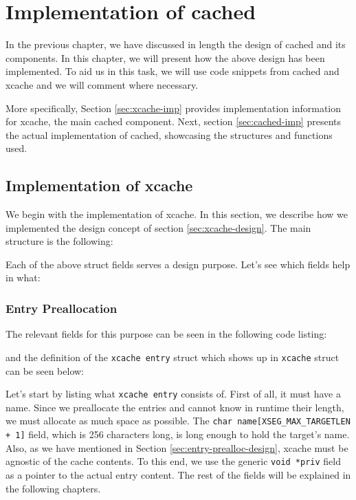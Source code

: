 \chapter{Implementation of cached}\label{ch:cached-implementation}

In the previous chapter, we have discussed in length the design of cached and 
its components. In this chapter, we will present how the above design has been
implemented. To aid us in this task, we will use code snippets from cached and 
xcache and we will comment where necessary.

More specifically, Section \ref{sec:xcache-imp} provides implementation 
information for xcache, the main cached component. Next, section 
\ref{sec:cached-imp} presents the actual implementation of cached, showcasing 
the structures and functions used.

\section{Implementation of xcache}\label{sec:xcache:imp}

We begin with the implementation of xcache.  In this section, we describe how 
we implemented the design concept of section \ref{sec:xcache-design}. The main 
\xcache structure is the following:


Each of the above \xcache struct fields serves a design purpose.
Let's see which fields help in what:

\subsection{Entry Preallocation}

The relevant fields for this purpose can be seen in the following code listing:


and the definition of the \texttt{xcache entry} struct which shows up in 
\texttt{xcache} struct can be seen below:


Let's start by listing what \texttt{xcache entry} consists of. First of all, it 
must have a name. Since we preallocate the entries and cannot know in runtime 
their length, we must allocate as much space as possible. The \texttt{char 
	name[XSEG\_MAX\_TARGETLEN + 1]} field, which is 256 characters long, is 
long enough to hold the target's name. Also, as we have mentioned in Section 
\ref{sec:entry-prealloc-design}, xcache must be agnostic of the cache contents.  
To this end, we use the generic \texttt{void *priv} field as a pointer to the 
actual entry content. The rest of the fields will be explained in the following 
chapters.

